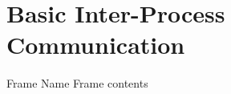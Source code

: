 
\section{Basic Inter-Process Communication}
\graphicspath{{figs/section3/}}

\begin{frame}{Frame Name}
    Frame contents
\end{frame}
